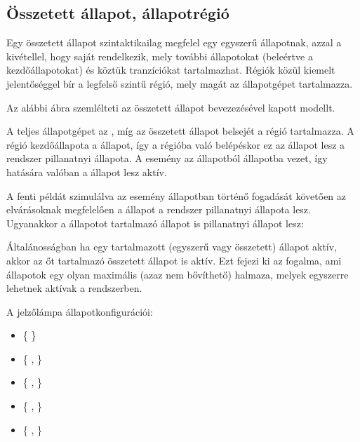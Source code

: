 \subsection{Összetett állapot, állapotrégió}

Egy összetett állapot szintaktikailag megfelel egy egyszerű állapotnak, azzal a kivétellel, hogy saját  rendelkezik, mely további állapotokat (beleértve a kezdőállapotokat) és köztük tranzíciókat tartalmazhat. Régiók közül kiemelt jelentőséggel bír a legfelső szintű régió, mely magát az állapotgépet tartalmazza.

\begin{megjegyzes}
	Az alábbi ábra szemlélteti az  összetett állapot bevezezésével kapott modellt.


	A teljes állapotgépet az , míg az összetett állapot belsejét a  régió tartalmazza. A  régió kezdőállapota a  állapot, így a régióba való belépéskor ez az állapot lesz a rendszer pillanatnyi állapota. A  esemény az  állapotból  állapotba vezet, így hatására valóban a  állapot lesz aktív.
\end{megjegyzes}

\begin{megjegyzes}
	A fenti példát szimulálva az  esemény  állapotban történő fogadását követően az elvárásoknak megfelelően a  állapot a rendszer pillanatnyi állapota lesz. Ugyanakkor a  állapotot tartalmazó  állapot is pillanatnyi állapot lesz:

\end{megjegyzes}

Általánosságban ha egy tartalmazott (egyszerű vagy összetett) állapot aktív, akkor az őt tartalmazó összetett állapot is aktív. Ezt fejezi ki az  fogalma, ami állapotok egy olyan maximális (azaz nem bővíthető) halmaza, melyek egyszerre lehetnek aktívak a rendszerben.

\begin{megjegyzes}
A jelzőlámpa állapotkonfigurációi:

\begin{itemize}
\item \{  \}
\item \{ ,  \}
\item \{ ,  \}
\item \{ ,  \}
\item \{ ,  \}
\end{itemize}
\end{megjegyzes}

